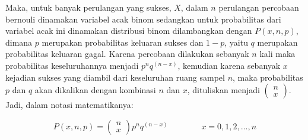 Maka, untuk banyak perulangan yang sukses, \begin{math}X\end{math}, dalam \begin{math}n\end{math} perulangan percobaan bernouli dinamakan variabel acak binom sedangkan untuk probabilitas dari variabel acak ini dinamakan distribusi binom dilambangkan dengan \begin{math}P(x,n,p)\end{math}, dimana \begin{math}p\end{math} merupakan probabilitas keluaran sukses dan \begin{math}1-p\end{math}, yaitu \begin{math}q\end{math} merupakan probabilitas keluaran gagal. Karena percobaan dilakukan sebanyak \begin{math}n\end{math} kali maka probabilitas keseluruhannya menjadi \begin{math}p^n q^{(n-x)}\end{math}, kemudian karena sebanyak \begin{math}x\end{math} kejadian sukses yang diambil dari keseluruhan ruang sampel \begin{math}n\end{math}, maka probabilitas \begin{math}p\end{math} dan \begin{math}q\end{math} akan dikalikan dengan kombinasi \begin{math}n\end{math} dan \begin{math}x\end{math}, dituliskan menjadi \begin{math}\left( {\begin{array}{c}n \\ x \end{array}} \right)\end{math}. Jadi, dalam notasi matematikanya:

\begin{displaymath}
	P(x,n,p) = \left( {\begin{array}{c}n \\ x \end{array}} \right) p^n q^{(n-x)}
	\qquad\qquad
	x = 0, 1, 2, ..., n
\end{displaymath}

